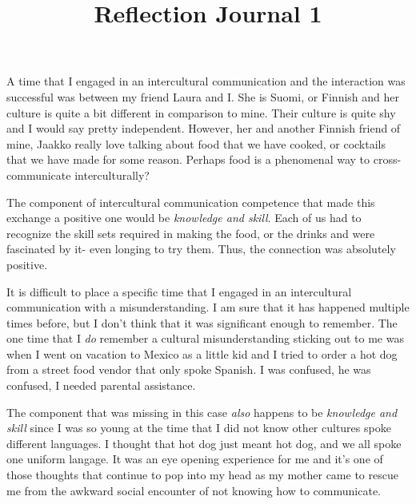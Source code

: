 \documentclass[12pt]{article}
\begin{document}
\title{Reflection Journal 1}





\par
A time that I engaged in an intercultural communication and the interaction was successful was between my friend Laura and I. She is Suomi, or Finnish and her culture is quite a bit different in comparison to mine. Their culture is quite shy and I would say pretty independent. However, her and another Finnish friend of mine, Jaakko really love talking about food that we have cooked, or cocktails that we have made for some reason. Perhaps food is a phenomenal way to cross-communicate interculturally? 
\par
The component of intercultural communication competence that made this exchange a positive one would be \emph{knowledge and skill}. Each of us had to recognize the skill sets required in making the food, or the drinks and were fascinated by it- even longing to try them. Thus, the connection was absolutely positive.
\par
It is difficult to place a specific time that I engaged in an intercultural communication with a misunderstanding. I am sure that it has happened multiple times before, but I don't think that it was significant enough to remember. The one time that I \emph{do} remember a cultural misunderstanding sticking out to me was when I went on vacation to Mexico as a little kid and I tried to order a hot dog from a street food vendor that only spoke Spanish. I was confused, he was confused, I needed parental assistance.
\par
The component that was missing in this case \emph{also} happens to be \emph{knowledge and skill} since I was so young at the time that I did not know other cultures spoke different languages. I thought that hot dog just meant hot dog, and we all spoke one uniform langage. It was an eye opening experience for me and it's one of those thoughts that continue to pop into my head as my mother came to rescue me from the awkward social encounter of not knowing how to communicate.
\end{document}
